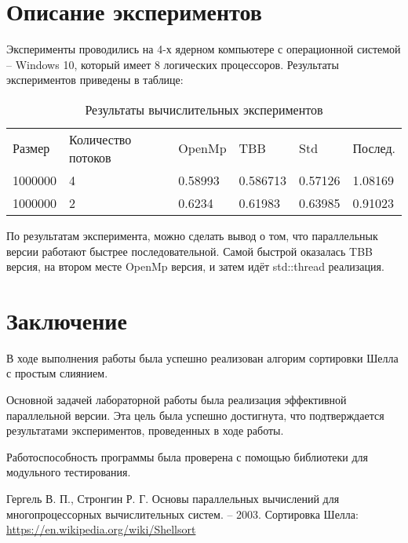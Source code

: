 \documentclass{report}
\begin{document}
\section*{Описание экспериментов}
Эксперименты проводились на 4-х ядерном компьютере с операционной системой – Windows 10, который имеет 8 логических процессоров. Результаты экспериментов приведены в таблице:
\begin{table}[!h]
\caption{Результаты вычислительных экспериментов}
\centering
\begin{tabular}{llllll}
Размер & Количество потоков & OpenMp & TBB & Std & Послед. \\
1000000 & 4 & 0.58993 & 0.586713 & 0.57126 & 1.08169\\
1000000 & 2 & 0.6234 & 0.61983 & 0.63985 & 0.91023\\
\end{tabular}
\end{table}
\par
По результатам эксперимента, можно сделать вывод о том, что параллельнык версии работают быстрее последовательной. Самой быстрой оказалась TBB версия, на втором месте OpenMp версия, и затем идёт std::thread реализация.
\newpage

\section*{Заключение}
В ходе выполнения работы была успешно реализован алгорим сортировки Шелла с простым слиянием.
\par 
Основной задачей лабораторной работы была реализация эффективной параллельной версии. Эта цель была успешно достигнута, что подтверждается результатами экспериментов, проведенных в ходе работы. 
\par 
Работоспособность программы была проверена с помощью библиотеки для модульного тестирования.
\newpage

\begin{thebibliography}{1}
Гергель В. П., Стронгин Р. Г. Основы параллельных вычислений для многопроцессорных вычислительных систем. – 2003.
Сортировка Шелла: \url {https://en.wikipedia.org/wiki/Shellsort }
\end{thebibliography}
\newpage

\end{document}

